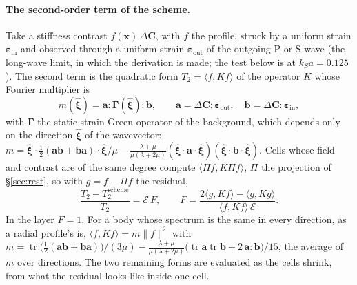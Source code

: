 \documentclass[11pt,a4paper]{article}
\newcommand{\bx}{\mathbf{x}}
\newcommand{\cE}{\mathcal{E}}
\begin{document}
\paragraph{The second-order term of the scheme.} Take a stiffness contrast $f(\bx)\,\Delta\mathbf{C}$,
with $f$ the profile, struck by a uniform strain $\boldsymbol\varepsilon_{\mathrm{in}}$ and observed
through a uniform strain $\boldsymbol\varepsilon_{\mathrm{out}}$ of the outgoing P or S wave (the
long-wave limit, in which the derivation is made; the test below is at $k_Sa=0.125$). The second
term is the quadratic form $T_2=\langle f,Kf\rangle$ of the operator $K$ whose Fourier multiplier is
\begin{equation}\label{eq:mfactor}
  m(\hat{\boldsymbol\xi})=\mathbf{a}:\boldsymbol\Gamma(\hat{\boldsymbol\xi}):\mathbf{b},\qquad
  \mathbf{a}=\Delta\mathbf{C}:\boldsymbol\varepsilon_{\mathrm{out}},\quad
  \mathbf{b}=\Delta\mathbf{C}:\boldsymbol\varepsilon_{\mathrm{in}},
\end{equation}
with $\boldsymbol\Gamma$ the static strain Green operator of the background, which depends only on the
direction $\hat{\boldsymbol\xi}$ of the wavevector:
$m=\hat{\boldsymbol\xi}\cdot\tfrac12(\mathbf{a}\mathbf{b}+\mathbf{b}\mathbf{a})\cdot\hat{\boldsymbol\xi}/\mu
-\tfrac{\lambda+\mu}{\mu(\lambda+2\mu)}(\hat{\boldsymbol\xi}\cdot\mathbf{a}\cdot\hat{\boldsymbol\xi})
(\hat{\boldsymbol\xi}\cdot\mathbf{b}\cdot\hat{\boldsymbol\xi})$. Cells whose field and contrast are
of the same degree compute $\langle\Pi f,K\Pi f\rangle$, $\Pi$ the projection of \S\ref{sec:rest}, so
with $g=f-\Pi f$ the residual,
\begin{equation}\label{eq:t2factor}
  \frac{T_2-T_2^{\mathrm{scheme}}}{T_2}=\cE\,F,\qquad
  F=\frac{2\langle g,Kf\rangle-\langle g,Kg\rangle}{\langle f,Kf\rangle\,\cE}.
\end{equation}
In the layer $F=1$. For a body whose spectrum is the same in every direction, as a radial profile's is,
$\langle f,Kf\rangle=\bar m\lVert f\rVert^2$ with
$\bar m=\operatorname{tr}\bigl(\tfrac12(\mathbf{a}\mathbf{b}+\mathbf{b}\mathbf{a})\bigr)/(3\mu)
-\tfrac{\lambda+\mu}{\mu(\lambda+2\mu)}\bigl(\operatorname{tr}\mathbf{a}\operatorname{tr}\mathbf{b}
+2\,\mathbf{a}:\mathbf{b}\bigr)/15$, the average of $m$ over directions. The two remaining forms are
evaluated as the cells shrink, from what the residual looks like inside one cell.
\end{document}
